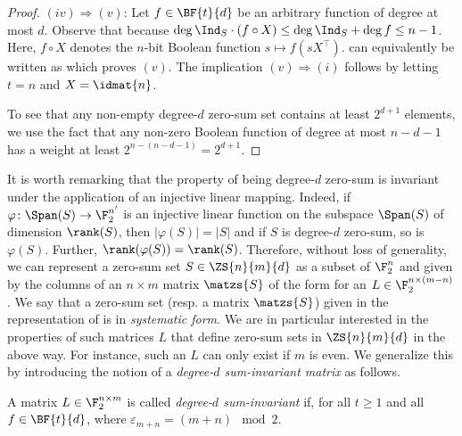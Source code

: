 \begin{proof}
$(iv) \Rightarrow (v)$: Let $f \in \BF{t}{d}$ be an arbitrary function of degree at most $d$. Observe that
because $\deg{\Ind_{S} \cdot (f \circ X)} \le \deg{\Ind_{S}} + \deg{f}\le n - 1$. Here, $f \circ X$ denotes the $n$-bit Boolean function $s \mapsto f(sX^\top)$.
 can equivalently be written as
which proves $(v)$. The implication $(v) \Rightarrow (i)$ follows by letting $t=n$ and $X = \idmat{n}$.

To see that any non-empty degree-$d$ zero-sum set contains at least $2^{d+1}$ elements, we use the fact that any non-zero Boolean function of degree at most $n-d-1$ has a weight at least $2^{n-(n-d-1)} = 2^{d+1}$. 
\end{proof}

It is worth remarking that the property of being degree-$d$ zero-sum  is invariant under the application of an injective linear mapping. Indeed, if $\varphi\colon \Span(S) \rightarrow \F_2^{n'}$ is an injective linear function on the subspace $\Span(S)$ of dimension $\rank(S)$, then $|\varphi(S)|=|S|$ and if $S$ is degree-$d$ zero-sum, so is $\varphi(S)$. Further, $\rank(\varphi(S)) = \rank(S)$. Therefore, without loss of generality, we can represent a zero-sum set $S \in \ZS{n}{m}{d}$ as a subset of $\F_2^n$ and given by the columns of an $n \times m$ matrix $\matzs{S}$ of the form 
for an $L \in \F_2^{n \times (m-n)}$. We say that a zero-sum set (resp. a matrix $\matzs{S}$) given in the representation of  is in \emph{systematic form}. We are in particular interested in the properties of such matrices $L$ that define zero-sum sets in $\ZS{n}{m}{d}$ in the above way. For instance, such an $L$ can only exist if $m$ is even. We generalize this by introducing the notion of a \emph{degree-$d$ sum-invariant matrix} as follows.



\begin{definition}
A matrix $L \in \F_2^{n \times m}$ is called \emph{degree-$d$ sum-invariant} if, for all $t \geq 1$ and all $f \in \BF{t}{d}$,
where $\varepsilon_{m+n} = (m+n) \mod 2$.
\end{definition}


